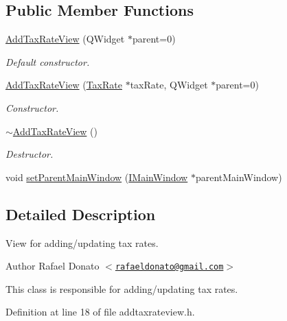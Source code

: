 \subsection*{\-Public \-Member \-Functions}
\begin{DoxyCompactItemize}
\item 
\hyperlink{class_add_tax_rate_view_a9ce680be25598c560858db5e2edf5136}{\-Add\-Tax\-Rate\-View} (\-Q\-Widget $\ast$parent=0)
\begin{DoxyCompactList}\small\item\em \-Default constructor. \end{DoxyCompactList}\item 
\hyperlink{class_add_tax_rate_view_ab378a4ad61a8dc919643f31d195f8409}{\-Add\-Tax\-Rate\-View} (\hyperlink{class_tax_rate}{\-Tax\-Rate} $\ast$tax\-Rate, \-Q\-Widget $\ast$parent=0)
\begin{DoxyCompactList}\small\item\em \-Constructor. \end{DoxyCompactList}\item 
\hyperlink{class_add_tax_rate_view_a25fadd4bbcfe3f06f88510c74b442ec2}{$\sim$\-Add\-Tax\-Rate\-View} ()
\begin{DoxyCompactList}\small\item\em \-Destructor. \end{DoxyCompactList}\item 
void \hyperlink{class_add_tax_rate_view_af6482b24c3952c973abe80cae7410b93}{set\-Parent\-Main\-Window} (\hyperlink{class_i_main_window}{\-I\-Main\-Window} $\ast$parent\-Main\-Window)
\end{DoxyCompactItemize}


\subsection{\-Detailed \-Description}
\-View for adding/updating tax rates. 

\begin{DoxyAuthor}{\-Author}
\-Rafael \-Donato $<$\href{mailto:rafaeldonato@gmail.com}{\tt rafaeldonato@gmail.\-com}$>$
\end{DoxyAuthor}
\-This class is responsible for adding/updating tax rates. 

\-Definition at line 18 of file addtaxrateview.\-h.




